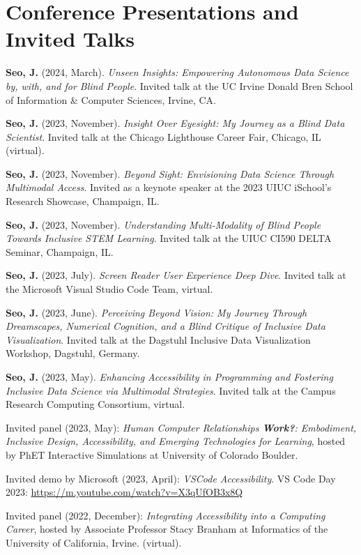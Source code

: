 \documentclass[11pt,a4paper,]{awesome-cv}
\begin{document}
\section{Conference Presentations and Invited
Talks}\label{conference-presentations-and-invited-talks}

\textbf{Seo, J.} (2024, March). \emph{Unseen Insights: Empowering
Autonomous Data Science by, with, and for Blind People}. Invited talk at
the UC Irvine Donald Bren School of Information \& Computer Sciences,
Irvine, CA.

\textbf{Seo, J.} (2023, November). \emph{Insight Over Eyesight: My
Journey as a Blind Data Scientist}. Invited talk at the Chicago
Lighthouse Career Fair, Chicago, IL (virtual).

\textbf{Seo, J.} (2023, November). \emph{Beyond Sight: Envisioning Data
Science Through Multimodal Access}. Invited as a keynote speaker at the
2023 UIUC iSchool's Research Showcase, Champaign, IL.

\textbf{Seo, J.} (2023, November). \emph{Understanding Multi-Modality of
Blind People Towards Inclusive STEM Learning}. Invited talk at the UIUC
CI590 DELTA Seminar, Champaign, IL.

\textbf{Seo, J.} (2023, July). \emph{Screen Reader User Experience Deep
Dive}. Invited talk at the Microsoft Visual Studio Code Team, virtual.

\textbf{Seo, J.} (2023, June). \emph{Perceiving Beyond Vision: My
Journey Through Dreamscapes, Numerical Cognition, and a Blind Critique
of Inclusive Data Visualization}. Invited talk at the Dagstuhl Inclusive
Data Visualization Workshop, Dagstuhl, Germany.

\textbf{Seo, J.} (2023, May). \emph{Enhancing Accessibility in
Programming and Fostering Inclusive Data Science via Multimodal
Strategies}. Invited talk at the Campus Research Computing Consortium,
virtual.

Invited panel (2023, May): \emph{Human Computer Relationships
\textbf{Work?}: Embodiment, Inclusive Design, Accessibility, and
Emerging Technologies for Learning}, hosted by PhET Interactive
Simulations at University of Colorado Boulder.

Invited demo by Microsoft (2023, April): \emph{VSCode Accessibility}. VS
Code Day 2023: \url{https://m.youtube.com/watch?v=X3qUfOB3x8Q}

Invited panel (2022, December): \emph{Integrating Accessibility into a
Computing Career}, hosted by Associate Professor Stacy Branham at
Informatics of the University of California, Irvine. (virtual).
\end{document}
